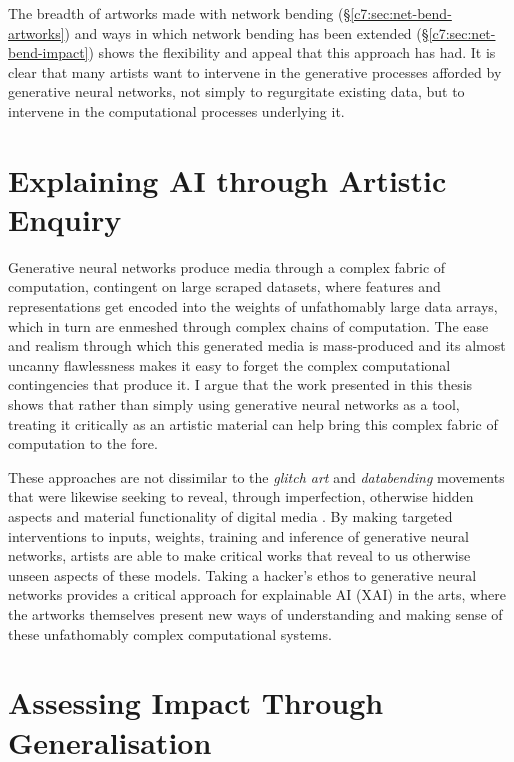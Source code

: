 The breadth of artworks made with network bending (\S \ref{c7:sec:net-bend-artworks}) and ways in which network bending has been extended (\S \ref{c7:sec:net-bend-impact}) shows the flexibility and appeal that this approach has had.
It is clear that many artists want to intervene in the generative processes afforded by generative neural networks, not simply to regurgitate existing data, but to intervene in the computational processes underlying it.

\section{Explaining AI through Artistic Enquiry}
\label{c8:sec:explaining}

Generative neural networks produce media through a complex fabric of computation, contingent on large scraped datasets, where features and representations get encoded into the weights of unfathomably large data arrays, which in turn are enmeshed through complex chains of computation. 
The ease and realism through which this generated media is mass-produced and its almost uncanny flawlessness \citep{smith2023ai} makes it easy to forget the complex computational contingencies that produce it. 
I argue that the work presented in this thesis shows that rather than simply using generative neural networks as a tool, treating it critically as an artistic material can help bring this complex fabric of computation to the fore. 

These approaches are not dissimilar to the \textit{glitch art} and \textit{databending} movements that were likewise seeking to reveal, through imperfection, otherwise hidden aspects and material functionality of digital media \citep{kemper2023glitch}.
By making targeted interventions to inputs, weights, training and inference of generative neural networks, artists are able to make critical works that reveal to us otherwise unseen aspects of these models. 
Taking a hacker's ethos to generative neural networks provides a critical approach for explainable AI (XAI) in the arts,
where the artworks themselves present new ways of understanding and making sense of these unfathomably complex computational systems. 

\section{Assessing Impact Through Generalisation}
\label{c8:sec:generalisation}

